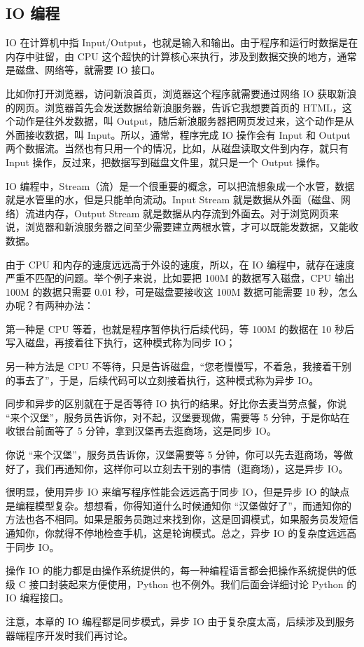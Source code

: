 \hypertarget{io-ux7f16ux7a0b}{%
\subsection{IO 编程}\label{io-ux7f16ux7a0b}}

IO 在计算机中指
Input/Output，也就是输入和输出。由于程序和运行时数据是在内存中驻留，由
CPU
这个超快的计算核心来执行，涉及到数据交换的地方，通常是磁盘、网络等，就需要
IO 接口。

比如你打开浏览器，访问新浪首页，浏览器这个程序就需要通过网络 IO
获取新浪的网页。浏览器首先会发送数据给新浪服务器，告诉它我想要首页的
HTML，这个动作是往外发数据，叫
Output，随后新浪服务器把网页发过来，这个动作是从外面接收数据，叫
Input。所以，通常，程序完成 IO 操作会有 Input 和 Output
两个数据流。当然也有只用一个的情况，比如，从磁盘读取文件到内存，就只有
Input 操作，反过来，把数据写到磁盘文件里，就只是一个 Output 操作。

IO
编程中，Stream（流）是一个很重要的概念，可以把流想象成一个水管，数据就是水管里的水，但是只能单向流动。Input
Stream 就是数据从外面（磁盘、网络）流进内存，Output Stream
就是数据从内存流到外面去。对于浏览网页来说，浏览器和新浪服务器之间至少需要建立两根水管，才可以既能发数据，又能收数据。

由于 CPU 和内存的速度远远高于外设的速度，所以，在 IO
编程中，就存在速度严重不匹配的问题。举个例子来说，比如要把 100M
的数据写入磁盘，CPU 输出 100M 的数据只需要 0.01 秒，可是磁盘要接收这
100M 数据可能需要 10 秒，怎么办呢？有两种办法：

第一种是 CPU 等着，也就是程序暂停执行后续代码，等 100M 的数据在 10
秒后写入磁盘，再接着往下执行，这种模式称为同步 IO；

另一种方法是 CPU
不等待，只是告诉磁盘，``您老慢慢写，不着急，我接着干别的事去了''，于是，后续代码可以立刻接着执行，这种模式称为异步
IO。

同步和异步的区别就在于是否等待 IO 执行的结果。好比你去麦当劳点餐，你说
``来个汉堡''，服务员告诉你，对不起，汉堡要现做，需要等 5
分钟，于是你站在收银台前面等了 5 分钟，拿到汉堡再去逛商场，这是同步 IO。

你说 ``来个汉堡''，服务员告诉你，汉堡需要等 5
分钟，你可以先去逛商场，等做好了，我们再通知你，这样你可以立刻去干别的事情（逛商场），这是异步
IO。

很明显，使用异步 IO 来编写程序性能会远远高于同步 IO，但是异步 IO
的缺点是编程模型复杂。想想看，你得知道什么时候通知你
``汉堡做好了''，而通知你的方法也各不相同。如果是服务员跑过来找到你，这是回调模式，如果服务员发短信通知你，你就得不停地检查手机，这是轮询模式。总之，异步
IO 的复杂度远远高于同步 IO。

操作 IO
的能力都是由操作系统提供的，每一种编程语言都会把操作系统提供的低级 C
接口封装起来方便使用，Python 也不例外。我们后面会详细讨论 Python 的 IO
编程接口。

注意，本章的 IO 编程都是同步模式，异步 IO
由于复杂度太高，后续涉及到服务器端程序开发时我们再讨论。

